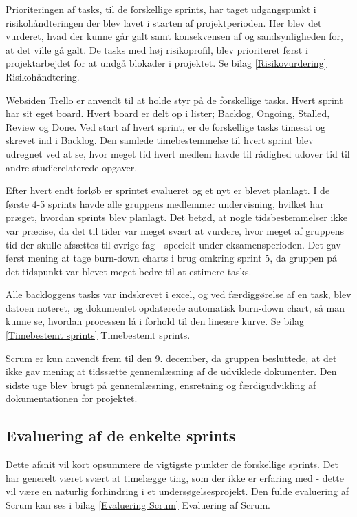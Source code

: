 Prioriteringen af tasks, til de forskellige sprints, har taget udgangspunkt i risikohåndteringen der blev lavet i starten af projektperioden. Her blev det vurderet, hvad der kunne går galt samt konsekvensen af og sandsynligheden for, at det ville gå galt. De tasks med høj risikoprofil, blev prioriteret først i projektarbejdet for at undgå blokader i projektet. Se bilag \ref{Risikovurdering} Risikohåndtering.  

Websiden Trello er anvendt til at holde styr på de forskellige tasks. Hvert sprint har sit eget board. Hvert board er delt op i lister; Backlog, Ongoing, Stalled, Review og Done. Ved start af hvert sprint, er de forskellige tasks timesat og skrevet ind i Backlog. Den samlede timebestemmelse til hvert sprint blev udregnet ved at se, hvor meget tid hvert medlem havde til rådighed udover tid til andre studierelaterede opgaver. 

Efter hvert endt forløb er sprintet evalueret og et nyt er blevet planlagt. I de første 4-5 sprints havde alle gruppens medlemmer undervisning, hvilket har præget, hvordan sprints blev planlagt. Det betød, at nogle tidsbestemmelser ikke var præcise, da det til tider var meget svært at vurdere, hvor meget af gruppens tid der skulle afsættes til øvrige fag - specielt under eksamensperioden. Det gav først mening at tage burn-down charts i brug omkring sprint 5, da gruppen på det tidspunkt var blevet meget bedre til at estimere tasks.

Alle backloggens tasks var indskrevet i excel, og ved færdiggørelse af en task, blev datoen noteret, og dokumentet opdaterede automatisk burn-down chart, så man kunne se, hvordan processen lå i forhold til den lineære kurve. Se bilag \ref{Timebestemt sprints} Timebestemt sprints. 

Scrum er kun anvendt frem til den 9. december, da gruppen besluttede, at det ikke gav mening at tidssætte gennemlæsning af de udviklede dokumenter. Den sidste uge blev brugt på gennemlæsning, ensretning og færdigudvikling af dokumentationen for projektet.  

\subsection{Evaluering af de enkelte sprints} 
Dette afsnit vil kort opsummere de vigtigste punkter de forskellige sprints. Det har generelt været svært at timelægge ting, som der ikke er erfaring med - dette vil være en naturlig forhindring i et undersøgelsesprojekt. Den fulde evaluering af Scrum kan ses i bilag \ref{Evaluering Scrum} Evaluering af Scrum.

